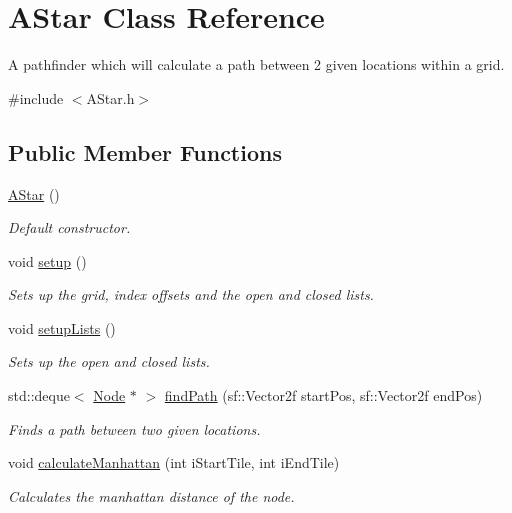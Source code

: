 \hypertarget{class_a_star}{}\section{A\+Star Class Reference}
\label{class_a_star}


A pathfinder which will calculate a path between 2 given locations within a grid.  




{\ttfamily \#include $<$A\+Star.\+h$>$}

\subsection*{Public Member Functions}
\begin{DoxyCompactItemize}
\item 
\hyperlink{class_a_star_ab7cfaf9e1662f45f5fdce245d28c4508}{A\+Star} ()
\begin{DoxyCompactList}\small\item\em Default constructor. \end{DoxyCompactList}\item 
void \hyperlink{class_a_star_a16fac41da7fa30b0f1ba7ef858ff6b66}{setup} ()
\begin{DoxyCompactList}\small\item\em Sets up the grid, index offsets and the open and closed lists. \end{DoxyCompactList}\item 
void \hyperlink{class_a_star_a01775826f813500ed1f27689cb58b22c}{setup\+Lists} ()
\begin{DoxyCompactList}\small\item\em Sets up the open and closed lists. \end{DoxyCompactList}\item 
std\+::deque$<$ \hyperlink{struct_node}{Node} $\ast$ $>$ \hyperlink{class_a_star_ac6d53e48b90dccde1b49409fa9f77098}{find\+Path} (sf\+::\+Vector2f start\+Pos, sf\+::\+Vector2f end\+Pos)
\begin{DoxyCompactList}\small\item\em Finds a path between two given locations. \end{DoxyCompactList}\item 
void \hyperlink{class_a_star_ab2e6d1c09df20a033d7277f01be1bc6f}{calculate\+Manhattan} (int i\+Start\+Tile, int i\+End\+Tile)
\begin{DoxyCompactList}\small\item\em Calculates the manhattan distance of the node. \end{DoxyCompactList}\item 

\end{DoxyCompactItemize}
